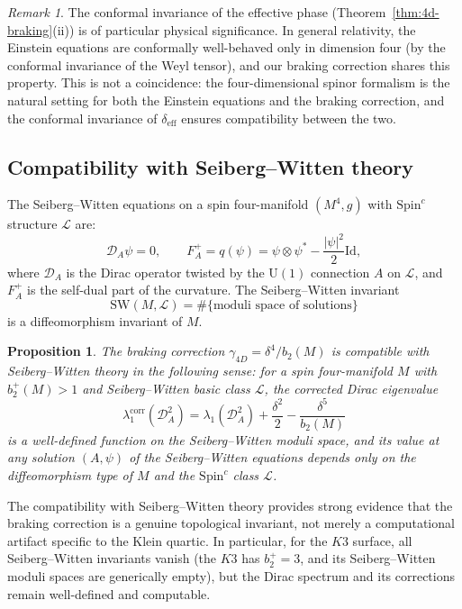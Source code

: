 \documentclass[12pt,a4paper]{article}
\newtheorem{proposition}[theorem]{Proposition}
\theoremstyle{definition}
\theoremstyle{remark}
\newtheorem{remark}[theorem]{Remark}
\newcommand{\cD}{\mathcal{D}}
\newcommand{\cL}{\mathcal{L}}
\newcommand{\U}{\mathrm{U}}
\newcommand{\Spinc}{\mathrm{Spin}^c}
\begin{document}
\begin{remark}
The conformal invariance of the effective phase (Theorem~\ref{thm:4d-braking}(ii)) is of particular physical significance. In general relativity, the Einstein equations are conformally well-behaved only in dimension four (by the conformal invariance of the Weyl tensor), and our braking correction shares this property. This is not a coincidence: the four-dimensional spinor formalism is the natural setting for both the Einstein equations and the braking correction, and the conformal invariance of $\delta_{\mathrm{eff}}$ ensures compatibility between the two.
\end{remark}

\subsection{Compatibility with Seiberg--Witten theory}

The Seiberg--Witten equations on a spin four-manifold $(M^4, g)$ with $\Spinc$ structure $\cL$ are:
\begin{equation}
\cD_A \psi = 0, \qquad F_A^+ = q(\psi) = \psi \otimes \psi^* - \frac{|\psi|^2}{2} \mathrm{Id},
\end{equation}
where $\cD_A$ is the Dirac operator twisted by the $\U(1)$ connection $A$ on $\cL$, and $F_A^+$ is the self-dual part of the curvature. The Seiberg--Witten invariant
\begin{equation}
\mathrm{SW}(M, \cL) = \# \{ \text{moduli space of solutions} \}
\end{equation}
is a diffeomorphism invariant of $M$.

\begin{proposition}
The braking correction $\gamma_{4D} = \delta^4/b_2(M)$ is compatible with Seiberg--Witten theory in the following sense: for a spin four-manifold $M$ with $b_2^+(M) > 1$ and Seiberg--Witten basic class $\cL$, the corrected Dirac eigenvalue
\begin{equation}
\lambda_1^{\mathrm{corr}}(\cD_A^2) = \lambda_1(\cD_A^2) + \frac{\delta^2}{2} - \frac{\delta^5}{b_2(M)}
\end{equation}
is a well-defined function on the Seiberg--Witten moduli space, and its value at any solution $(A, \psi)$ of the Seiberg--Witten equations depends only on the diffeomorphism type of $M$ and the $\Spinc$ class $\cL$.
\end{proposition}

The compatibility with Seiberg--Witten theory provides strong evidence that the braking correction is a genuine topological invariant, not merely a computational artifact specific to the Klein quartic. In particular, for the $K3$ surface, all Seiberg--Witten invariants vanish (the $K3$ has $b_2^+ = 3$, and its Seiberg--Witten moduli spaces are generically empty), but the Dirac spectrum and its corrections remain well-defined and computable.
\end{document}
